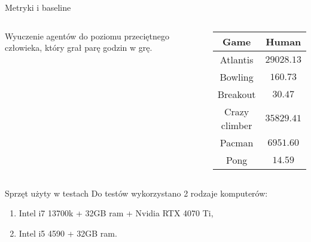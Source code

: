 \begin{frame}{Metryki i baseline}
  \begin{columns}[t]
    \begin{center}
      Wyuczenie agentów do poziomu przeciętnego człowieka, który grał parę godzin w grę.  
    \end{center}
    \begin{center}
      \begin{tabular}{||c c||} 
       \hline
       Game & Human \\ [0.5ex] 
       \hline\hline
       Atlantis & $29028.13$ \\ 
       \hline
       Bowling & $160.73$  \\
       \hline
       Breakout & $30.47$ \\
       \hline
       Crazy climber & $35829.41$  \\
       \hline
       Pacman & $6951.60$  \\
       \hline
       Pong & $14.59$  \\ [1ex] 
       \hline
      \end{tabular}
      \end{center}
  \end{columns}
\end{frame}
\begin{frame}{Sprzęt użyty w testach}
  Do testów wykorzystano 2 rodzaje komputerów:
  \begin{enumerate}[<+->]
    \item Intel i7 13700k + 32GB ram + Nvidia RTX 4070 Ti,
    \item Intel i5 4590 + 32GB ram.
  \end{enumerate}  
\end{frame}
